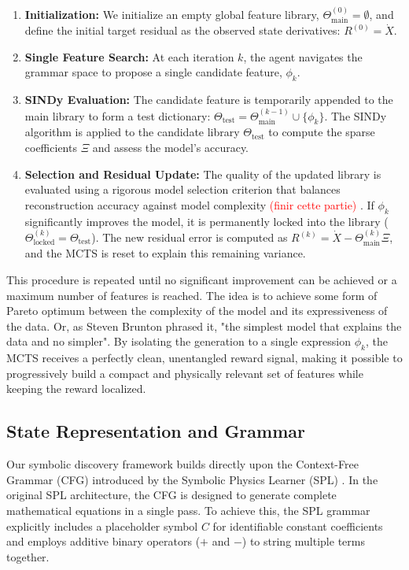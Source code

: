 \documentclass[11pt, a4paper]{article}
\begin{document}
\begin{enumerate}
    \item \textbf{Initialization:} We initialize an empty global feature library, $\Theta_{\text{main}}^{(0)} = \emptyset$, and define the initial target residual as the observed state derivatives: $R^{(0)} = \dot{X}$.
    \item \textbf{Single Feature Search:} At each iteration $k$, the agent navigates the grammar space to propose a single candidate feature, $\phi_k$.
    \item \textbf{SINDy Evaluation:} The candidate feature is temporarily appended to the main library to form a test dictionary: $\Theta_{\text{test}} = \Theta_{\text{main}}^{(k-1)} \cup \{\phi_k\}$. The SINDy algorithm is applied to the candidate library $\Theta_{\text{test}}$ to compute the sparse coefficients $\Xi$ and assess the model's accuracy.
    \item \textbf{Selection and Residual Update:} The quality of the updated library is evaluated using a rigorous model selection criterion that balances reconstruction accuracy against model complexity \textcolor{red}{ (finir cette partie) }. If $\phi_k$ significantly improves the model, it is permanently locked into the library ($\Theta_{\text{locked}}^{(k)} = \Theta_{\text{test}}$). The new residual error is computed as $R^{(k)} = \dot{X} - \Theta_{\text{main}}^{(k)}\Xi$, and the MCTS is reset to explain this remaining variance.
\end{enumerate}

This procedure is repeated until no significant improvement can be achieved or a maximum number of features is reached. The idea is to achieve some form of Pareto optimum between the complexity of the model and its expressiveness of the data. Or, as Steven Brunton phrased it,  "the simplest model that explains the data and no simpler". By isolating the generation to a single expression $\phi_k$, the MCTS receives a perfectly clean, unentangled reward signal, making it possible to progressively build a compact and physically relevant set of features while keeping the reward localized.

\subsection{State Representation and Grammar}

Our symbolic discovery framework builds directly upon the Context-Free Grammar (CFG) introduced by the Symbolic Physics Learner (SPL) \cite{sun2023spl}. In the original SPL architecture, the CFG is designed to generate complete mathematical equations in a single pass. To achieve this, the SPL grammar explicitly includes a placeholder symbol $C$ for identifiable constant coefficients and employs additive binary operators ($+$ and $-$) to string multiple terms together. \\
\end{document}
